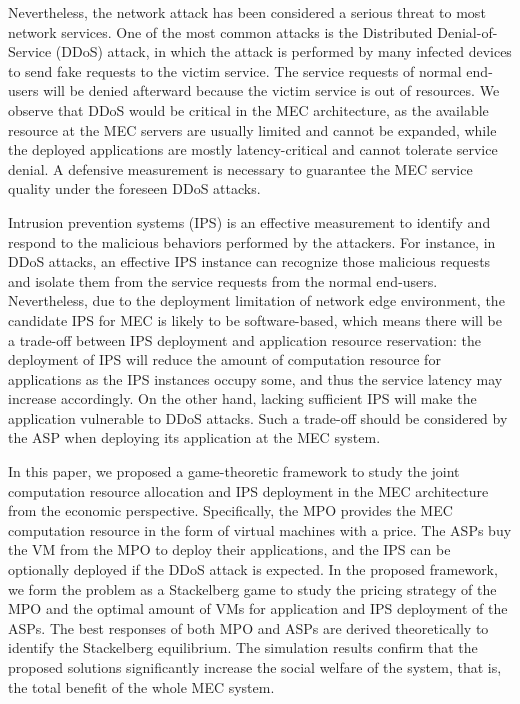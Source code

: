 \documentclass[conference]{IEEEtran}
\begin{document}
Nevertheless, the network attack has been considered a serious threat to most network services. One of the most common attacks is the Distributed Denial-of-Service (DDoS) attack, in which the attack is performed by many infected devices to send fake requests to the victim service. The service requests of normal end-users will be denied afterward because the victim service is out of resources. We observe that DDoS would be critical in the MEC architecture, as the available resource at the MEC servers are usually limited and cannot be expanded, while the deployed applications are mostly latency-critical and cannot tolerate service denial. A defensive measurement is necessary to guarantee the MEC service quality under the foreseen DDoS attacks.

Intrusion prevention systems (IPS) is an effective measurement to identify and respond to the malicious behaviors performed by the attackers. For instance, in DDoS attacks, an effective IPS instance can recognize those malicious requests and isolate them from the service requests from the normal end-users. Nevertheless, due to the deployment limitation of network edge environment, the candidate IPS for MEC is likely to be software-based, which means there will be a trade-off between IPS deployment and application resource reservation: the deployment of IPS will reduce the amount of computation resource for applications as the IPS instances occupy some, and thus the service latency may increase accordingly. On the other hand, lacking sufficient IPS will make the application vulnerable to DDoS attacks. Such a trade-off should be considered by the ASP when deploying its application at the MEC system. 

In this paper, we proposed a game-theoretic framework to study the joint computation resource allocation and IPS deployment in the MEC architecture from the economic perspective. Specifically, the MPO provides the MEC computation resource in the form of virtual machines with a price. The ASPs buy the VM from the MPO to deploy their applications, and the IPS can be optionally deployed if the DDoS attack is expected. In the proposed framework, we form the problem as a Stackelberg game to study the pricing strategy of the MPO and the optimal amount of VMs for application and IPS deployment of the ASPs. The best responses of both MPO and ASPs are derived theoretically to identify the Stackelberg equilibrium. The simulation results confirm that the proposed solutions significantly increase the social welfare of the system, that is, the total benefit of the whole MEC system.
\end{document}
